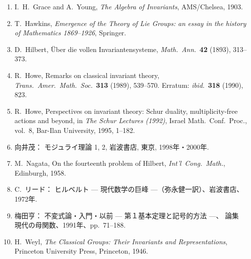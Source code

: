 \documentclass[uplatex,dvipdfmx]{jlreq}
\begin{document}
\begin{enumerate}
  \item[{[GY]}] I.~H.~Grace and A.~Young,
        \textit{The Algebra of Invariants},
        AMS/Chelsea, 1903.

  \item[{[Ha]}] T.~Hawkins,
        \textit{Emergence of the Theory of Lie Groups:
        an essay in the history of Mathematics 1869--1926},
        Springer.

  \item[{[Hi]}] D.~Hilbert,
        Über die vollen Invariantensysteme,
        \textit{Math.~Ann.}~\textbf{42} (1893), 313--373.

  \item[{[Ho1]}] R.~Howe,
        Remarks on classical invariant theory,
        \textit{Trans.~Amer.~Math.~Soc.}~\textbf{313} (1989), 539--570.
        Erratum: \textit{ibid.}~\textbf{318} (1990), 823.

  \item[{[Ho2]}] R.~Howe,
        Perspectives on invariant theory: Schur duality,
        multiplicity-free actions and beyond,
        in \textit{The Schur Lectures (1992)},
        Israel Math.~Conf.~Proc., vol.~8,
        Bar-Ilan University, 1995, 1--182.

  \item[{[Mu]}] 向井茂：
        モジュライ理論 1, 2, 岩波書店, 東京, 1998年・2000年.

  \item[{[Na]}] M.~Nagata,
        On the fourteenth problem of Hilbert,
        \textit{Int'l~Cong.~Math.}, Edinburgh, 1958.

  \item[{[R]}] C.~リード：
        ヒルベルト --- 現代数学の巨峰 ---（弥永健一訳）、岩波書店、1972年.

  \item[{[U]}] 梅田亨：
        不変式論・入門・以前 --- 第１基本定理と記号的方法 ---、
        論集　現代の母関数、1991年、pp.~71--188.

  \item[{[W]}] H.~Weyl,
        \textit{The Classical Groups: Their Invariants and Representations},
        Princeton University Press, Princeton, 1946.
\end{enumerate}
\end{document}

